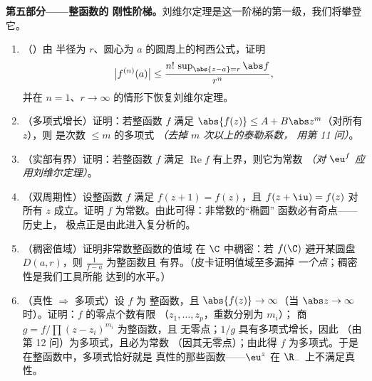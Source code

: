 \begin{problem}
\medskip
\noindent\textbf{第五部分——整函数的
刚性阶梯。}刘维尔定理是这一阶梯的第一级，我们将攀登
它。
\begin{enumerate}[resume]
  \item （）由
        半径为 $r$、圆心为 $a$ 的圆周上的柯西公式，证明
        \[
        \bigl|f^{(n)}(a)\bigr| \leq
        \frac{n!\,\sup_{\abs{z-a}=r}\abs f}{r^n} ,
        \]
        并在 $n = 1$、$r \to
        \infty$ 的情形下恢复刘维尔定理。
  \item （多项式增长）证明：若整函数 $f$
        满足 $\abs{f(z)} \leq A + B\abs z^m$（对所有 $z$），则
        是次数 $\leq m$ 的多项式 \emph{（去掉 $m$ 次以上的泰勒系数，
        用第 11 问）}。
  \item （实部有界）证明：若整函数 $f$
        满足 $\operatorname{Re}f$ 有上界，则它为常数
        \emph{（对 $\eu^{f}$ 应用刘维尔定理）}。
  \item （双周期性）设整函数 $f$ 满足 $f(z + 1)
        = f(z)$，且 $f(z + \iu) = f(z)$ 对所有 $z$ 成立。证明 $f$
        为常数。由此可得：非常数的“椭圆”
        函数必有奇点——历史上，
        极点正是由此进入复分析的。
  \item （稠密值域）证明非常数整函数的值域
        在 $\C$ 中稠密：若 $f(\C)$ 避开某圆盘
        $D(a, r)$，则 $\frac1{f - a}$ 为整函数且
        有界。（皮卡证明值域至多漏掉
        \emph{一个点}；稠密性是我们工具所能
        达到的水平。）
  \item （真性 $\Rightarrow$ 多项式）设 $f$ 为
        整函数，且 $\abs{f(z)} \to \infty$（当 $\abs z \to
        \infty$ 时）。证明：$f$ 的零点个数有限
        （$z_1, \dots, z_p$，重数分别为 $m_i$）；
        商 $g = f/\prod(z - z_i)^{m_i}$ 为整函数，且
        无零点；$1/g$ 具有多项式增长，因此
        （由第 12 问）为多项式，且必为常数
        （因其无零点）；由此得 $f$ 为多项式。于是
        在整函数中，多项式恰好就是
        真性的那些函数——$\eu^z$ 在
        $\R_-$ 上不满足真性。
\end{enumerate}


\end{problem}
